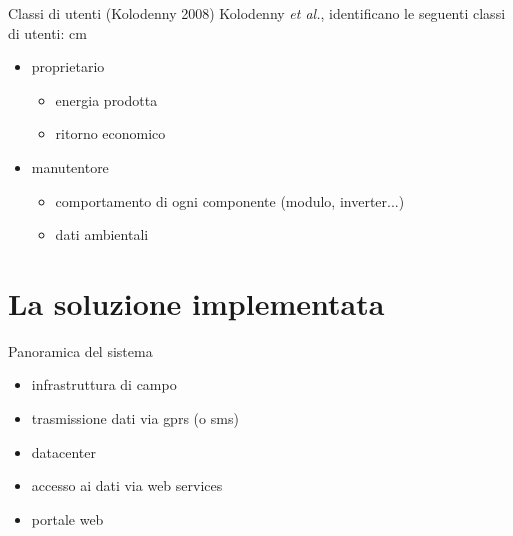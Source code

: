 \documentclass{beamer}
\newcommand{\N}{\vskip 0.3 cm}
\newcommand{\red}[1]{\textcolor[rgb]{.8,0,0}{#1}}
\newcommand{\green}[1]{\textcolor[rgb]{0,.6,.1}{#1}}
\begin{document}
%
\begin{frame}{Classi di utenti (Kolodenny 2008)}
Kolodenny \emph{et al.}, identificano le seguenti \green{classi di utenti}:
\N
%
\begin{itemize}
\item \red{proprietario}
  \begin{itemize}
  \item energia prodotta
  \item ritorno economico
  \end{itemize}
\item \red{manutentore}
  \begin{itemize}
  \item comportamento di ogni componente (modulo, inverter...)
  \item dati ambientali
  \end{itemize}
\end{itemize}
%
\end{frame}
%

%
\section{La soluzione implementata}
\begin{frame}{Panoramica del sistema}
%
\begin{figure}[!h]
  \begin{center}
  \end{center}
\end{figure}
%
\begin{itemize}
\item infrastruttura \red{di campo}
\item trasmissione dati via \red{gprs} (o \red{sms})
\item \red{datacenter}
\item accesso ai dati via \red{web services}
\item portale web
\end{itemize}
%
\end{frame}
%
\end{document}
